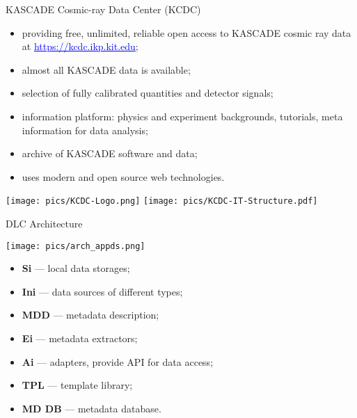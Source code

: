 \begin{frame}{KASCADE Cosmic-ray Data Center (KCDC)}
    \begin{itemize}
        \small
        \setlength{\itemsep}{0pt}
        \item providing free, unlimited, reliable open access to KASCADE cosmic ray data at \textcolor{blue}{\underline{https://kcdc.ikp.kit.edu}};
        \item almost all KASCADE data is available;
        \item selection of fully calibrated quantities and detector signals;
        \item information platform: physics and experiment backgrounds, tutorials, meta information for data analysis;
        \item archive of KASCADE software and data;
        \item uses modern and open source web technologies.
    \end{itemize}

\texttt{[image: pics/KCDC-Logo.png]}
\hfill
\texttt{[image: pics/KCDC-IT-Structure.pdf]}
\end{frame}


\begin{frame}{DLC Architecture}
\begin{minipage}[c]{0.63\textwidth}
  \texttt{[image: pics/arch\_appds.png]}
\end{minipage}
\hfill
\begin{minipage}[c]{0.36\textwidth}
  \small
  \begin{itemize}
    \setlength{\itemsep}{0pt}
    \item\textbf{Si} — local data storages;
    \item\textbf{Ini} — data sources of different types;
    \item\textbf{MDD} — metadata description;
    \item\textbf{Ei} — metadata extractors;
    \item\textbf{Ai} — adapters, provide API for data access;
    \item\textbf{TPL} — template library;
    \item\textbf{MD DB} — metadata database.
  \end{itemize}
\end{minipage}
\end{frame}
